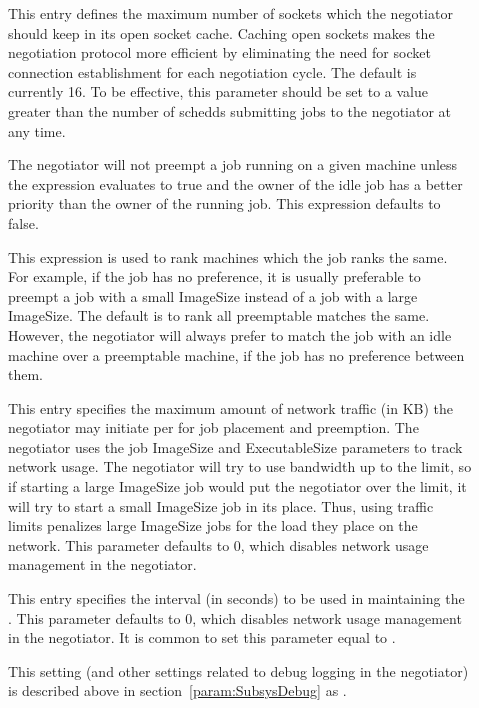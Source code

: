 \begin{description}
\item[]
  \label{param:NegotiatorSocketCacheSize} This entry defines the
  maximum number of sockets which the negotiator should keep in its
  open socket cache.  Caching open sockets makes the negotiation
  protocol more efficient by eliminating the need for socket
  connection establishment for each negotiation cycle.  The default is
  currently 16.  To be effective, this parameter should be set to a
  value greater than the number of schedds submitting jobs to the
  negotiator at any time.

\item[]
  \label{param:PreemptionRequirements} The negotiator will not preempt
  a job running on a given machine unless the
   expression evaluates to true and the
  owner of the idle job has a better priority than the owner of the
  running job.  This expression defaults to false.

\item[] \label{param:PreemptionRank} This
  expression is used to rank machines which the job ranks the same.
  For example, if the job has no preference, it is usually preferable
  to preempt a job with a small ImageSize instead of a job with a
  large ImageSize.  The default is to rank all preemptable matches the
  same.  However, the negotiator will always prefer to match the job
  with an idle machine over a preemptable machine, if the job has no
  preference between them.

\item[]
  \label{param:NegotiatorTrafficLimit} This entry specifies the
  maximum amount of network traffic (in KB) the negotiator may
  initiate per  for job placement
  and preemption.  The negotiator uses the job ImageSize and
  ExecutableSize parameters to track network usage.  The negotiator
  will try to use bandwidth up to the limit, so if starting a large
  ImageSize job would put the negotiator over the limit, it will try
  to start a small ImageSize job in its place.  Thus, using traffic
  limits penalizes large ImageSize jobs for the load they place on the
  network.  This parameter defaults to 0, which disables network usage
  management in the negotiator.

\item[]
  \label{param:NegotiatorTrafficInterval} This entry specifies the
  interval (in seconds) to be used in maintaining the
  .  This parameter defaults to 0,
  which disables network usage management in the negotiator.  It is
  common to set this parameter equal to .
  
\item[] \label{param:NegotiatorDebug} This setting
  (and other settings related to debug logging in the negotiator) is
  described above in section~\ref{param:SubsysDebug} as
  .

\end{description}
